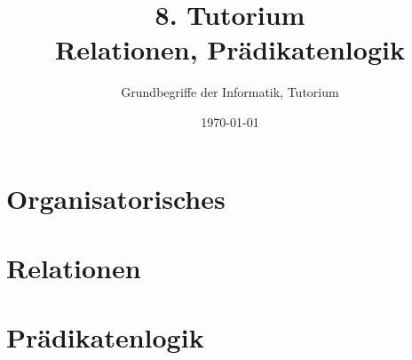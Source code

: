 




\title[Relationen, Prädikatenlogik]{8. Tutorium\\ Relationen, Prädikatenlogik}
\subtitle{Grundbegriffe der Informatik, Tutorium \hashtag\mytutnumber}
\date{\today}


\titleframe
\roadmap

\section[Orga]{Organisatorisches}



\section{Relationen}


\section{Prädikatenlogik}



\section{}
\questionframe
\lastframe
{}
